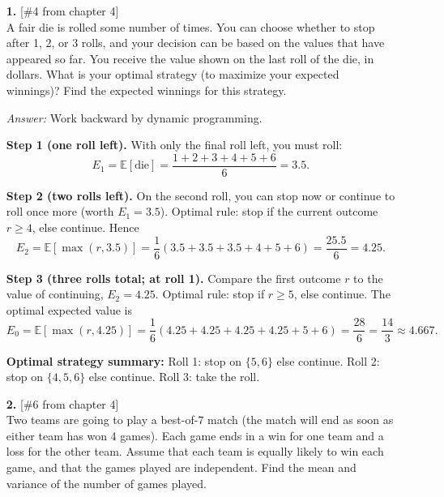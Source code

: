 \documentclass{article}
\begin{document}
\begin{enumerate}

\item[\textbf{1.}] [\#4 from chapter 4]\\
A fair die is rolled some number of times. You can choose whether to stop after 1, 2, or 3 rolls, and your decision can be based on the values that have appeared so far. You receive the value shown on the last roll of the die, in dollars. What is your optimal strategy (to maximize your expected winnings)? Find the expected winnings for this strategy.

\medskip
\noindent\textit{Answer:}
Work backward by dynamic programming.

\textbf{Step 1 (one roll left).}
With only the final roll left, you must roll:
\[
E_1=\mathbb{E}[\text{die}]=\frac{1+2+3+4+5+6}{6}=3.5.
\]

\textbf{Step 2 (two rolls left).}
On the second roll, you can stop now or continue to roll once more (worth $E_1=3.5$). Optimal rule: stop if the current outcome $r\ge 4$, else continue. Hence
\[
E_2=\mathbb{E}[\max(r,3.5)]
=\frac{1}{6}(3.5+3.5+3.5+4+5+6)
=\frac{25.5}{6}=4.25.
\]

\textbf{Step 3 (three rolls total; at roll 1).}
Compare the first outcome $r$ to the value of continuing, $E_2=4.25$. Optimal rule: stop if $r\ge 5$, else continue. The optimal expected value is
\[
E_0=\mathbb{E}[\max(r,4.25)]
=\frac{1}{6}(4.25+4.25+4.25+4.25+5+6)
=\frac{28}{6}=\boxed{\frac{14}{3}\approx 4.667}.
\]

\noindent\textbf{Optimal strategy summary:} Roll 1: stop on $\{5,6\}$ else continue. Roll 2: stop on $\{4,5,6\}$ else continue. Roll 3: take the roll.

\bigskip

\item[\textbf{2.}] [\#6 from chapter 4]\\
Two teams are going to play a best-of-7 match (the match will end as soon as either team has won 4 games).
Each game ends in a win for one team and a loss for the other team.
Assume that each team is equally likely to win each game, and that the games played are independent.
Find the mean and variance of the number of games played.


\end{enumerate}
\end{document}
